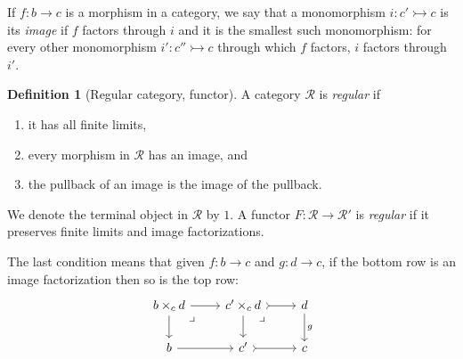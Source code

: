 \documentclass[11pt, oneside, article]{memoir}
\theoremstyle{plain}
\theoremstyle{definition}
\newtheorem{definition}[theorem]{Definition}
\theoremstyle{remark}
\newcommand{\cat}[1]{\mathcal{#1}}%
\newcommand{\inj}{\rightarrowtail}
\newcommand{\pb}[1][very near start]{\ar[dr, phantom, #1, "\lrcorner"]}
\begin{document}
If $f\colon b\to c$ is a morphism in a category, we say that a monomorphism $i\colon c'\inj c$ is its \emph{image} if $f$ factors through $i$ and it is the smallest such monomorphism: for every other monomorphism $i'\colon c''\inj c$ through which $f$ factors, $i$ factors through $i'$.
 
\begin{definition}[Regular category, functor] \label{def.reg_cat}
A category $\cat{R}$ is \emph{regular} if
\begin{enumerate}
	\item it has all finite limits,
	\item every morphism in $\cat{R}$ has an image, and
	\item the pullback of an image is the image of the pullback.
\end{enumerate}
We denote the terminal object in $\cat{R}$ by $1$. A functor $F\colon\cat{R}\to\cat{R}'$ is \emph{regular} if it preserves finite limits and image factorizations.
\end{definition}
The last condition means that given $f\colon b\to c$ and $g\colon d\to c$, if the bottom row is an image factorization then so is the top row:
\[
\begin{tikzcd}
	b\times_cd\ar[r]\ar[d]\pb&
	c'\times_cd\ar[r, >->]\ar[d]\pb&
	d\ar[d, "g"]\\
	b\ar[r]&
	c'\ar[r, >->]&
	c
\end{tikzcd}
\]
\end{document}
